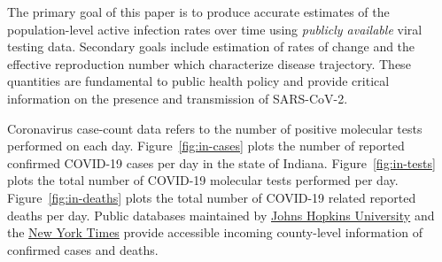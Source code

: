 \documentclass[11pt]{amsart}
\numberwithin{equation}{section}
\theoremstyle{plain}
\begin{document}
 The primary goal of this paper is to produce accurate estimates of the population-level active infection rates over time using \emph{publicly available} viral testing data.  Secondary goals include estimation of rates of change and the effective reproduction number which characterize disease trajectory.
 These quantities are fundamental to public health policy and provide critical information on the presence and transmission of SARS-CoV-2.



 Coronavirus case-count data refers to the number of positive molecular tests performed on each day.  Figure~\ref{fig:in-cases} plots the number of reported confirmed COVID-19 cases per day in the state of Indiana.  Figure~\ref{fig:in-tests} plots the total number of COVID-19 molecular tests performed per day. Figure~\ref{fig:in-deaths} plots the total number of COVID-19 related reported deaths per day. Public databases maintained by \href{https://bit.ly/2UqFSuA}{Johns Hopkins University} and the \href{https://bit.ly/2vUHfrK}{New York Times} provide accessible incoming county-level information of confirmed cases and deaths.
\end{document}
